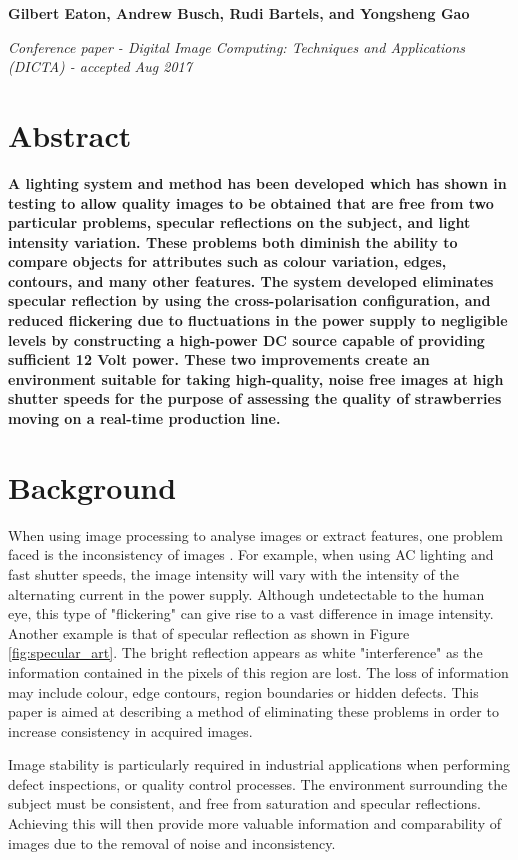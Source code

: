 \documentclass[fleqn,twoside,12pt]{report}
\begin{document}
\textbf{Gilbert Eaton, Andrew Busch, Rudi Bartels, and Yongsheng Gao}

\textit{Conference paper - Digital Image Computing: Techniques and Applications (DICTA) - accepted Aug 2017}


\section{Abstract}

\textbf{A lighting system and method has been developed which has shown in testing to allow quality images to be obtained that are free from two particular problems, specular reflections on the subject, and light intensity variation. These problems both diminish the ability to compare objects for attributes such as colour variation, edges, contours, and many other features. The system developed eliminates specular reflection by using the cross-polarisation configuration, and reduced flickering due to fluctuations in the power supply to negligible levels by constructing a high-power DC source capable of providing sufficient 12 Volt power. These two improvements create an environment suitable for taking high-quality, noise free images at high shutter speeds for the purpose of assessing the quality of strawberries moving on a real-time production line.}


\section{Background}


When using image processing to analyse images or extract features, one problem faced is the inconsistency of images \cite{atkinson}.  For example, when using AC lighting and fast shutter speeds, the image intensity will vary with the intensity of the alternating current in the power supply. Although undetectable to the human eye, this type of "flickering" can give rise to a vast difference in image intensity. Another example is that of specular reflection as shown in Figure \ref{fig:specular_art}. The bright reflection appears as white "interference" as the information contained in the pixels of this region are lost. The loss of information may include colour, edge contours, region boundaries or hidden defects. This paper is aimed at describing a method of eliminating these problems in order to increase consistency in acquired images.

Image stability is particularly required in industrial applications when performing defect inspections, or quality control processes. The environment surrounding the subject must be consistent, and free from saturation and specular reflections. Achieving this will then provide more valuable information and comparability of images due to the removal of noise and inconsistency.
\end{document}
